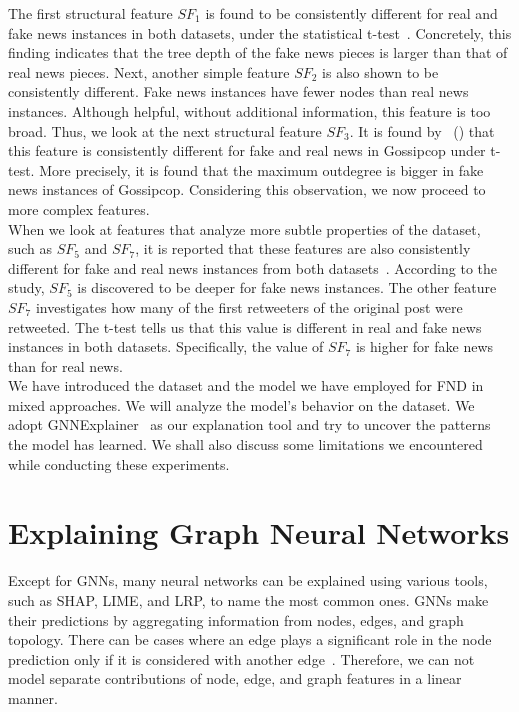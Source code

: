 The first structural feature $SF_1$ is found to be consistently different for real and fake news instances in both datasets, under the statistical t-test~\parencite{HierarchicalPropagationNetworksForFND_Shu}. Concretely, this finding indicates that the tree depth of the fake news pieces is larger than that of real news pieces. Next, another simple feature $SF_2$ is also shown to be consistently different. Fake news instances have fewer nodes than real news instances. Although helpful, without additional information, this feature is too broad. Thus, we look at the next structural feature $SF_3$. It is found by~\citeauthor{HierarchicalPropagationNetworksForFND_Shu} (\citeyear{HierarchicalPropagationNetworksForFND_Shu}) that this feature is consistently different for fake and real news in Gossipcop under t-test. More precisely, it is found that the maximum outdegree is bigger in fake news instances of Gossipcop. Considering this observation, we now proceed to more complex features.\\
When we look at features that analyze more subtle properties of the dataset, such as $SF_5$ and $SF_7$, it is reported that these features are also consistently different for fake and real news instances from both datasets~\parencite{HierarchicalPropagationNetworksForFND_Shu}. According to the study, $SF_5$ is discovered to be deeper for fake news instances. The other feature $SF_7$ investigates how many of the first retweeters of the original post were retweeted. The t-test tells us that this value is different in real and fake news instances in both datasets. Specifically, the value of $SF_7$ is higher for fake news than for real news.\\
We have introduced the dataset and the model we have employed for FND in mixed approaches. We will analyze the model's behavior on the dataset. We adopt GNNExplainer~\parencite{GNNExplainer_Ying} as our explanation tool and try to uncover the patterns the model has learned. We shall also discuss some limitations we encountered while conducting these experiments.

\section{Explaining Graph Neural Networks}
\label{sec:ExplainingGNNs}
Except for GNNs, many neural networks can be explained using various tools, such as SHAP, LIME, and LRP, to name the most common ones. GNNs make their predictions by aggregating information from nodes, edges, and graph topology. There can be cases where an edge plays a significant role in the node prediction only if it is considered with another edge~\parencite{CNNsOnGraphsForLearningMolecularFingerprints_Duvenaud}. Therefore, we can not model separate contributions of node,
edge, and graph features in a linear manner.\\

